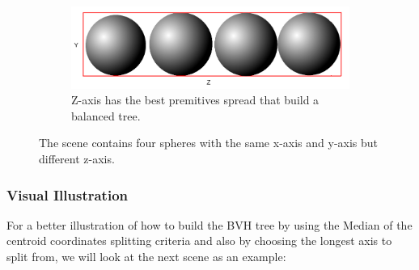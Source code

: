 \documentclass[11pt,a4paper]{article}
\begin{document}
\begin{figure}[H]
\begin{subfigure}[b]{0.3\textwidth}
         \label{fig:pi_5000}
     \end{subfigure}
     \hfill
     \begin{subfigure}[b]{0.3\textwidth}
         \centering
         \includegraphics[width=\textwidth]{images/LONGAXIS_Z.png}
         \caption{Z-axis has the best premitives spread that build a balanced tree.}
         \label{fig:pi_18000}
     \end{subfigure}
        \caption{The scene contains four spheres with the same x-axis and y-axis but different z-axis. }
        \label{fig:three graphs}
\end{figure}

\subsubsection{Visual Illustration}
For a better illustration of how to build the BVH tree by using the Median of the centroid coordinates splitting criteria and also by choosing the longest axis to split from, we will look at the next scene as an example: 
\end{document}
